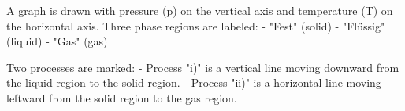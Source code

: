 A graph is drawn with pressure (p) on the vertical axis and temperature (T) on the horizontal axis. Three phase regions are labeled:  
- "Fest" (solid)  
- "Flüssig" (liquid)  
- "Gas" (gas)  

Two processes are marked:  
- Process "i)" is a vertical line moving downward from the liquid region to the solid region.  
- Process "ii)" is a horizontal line moving leftward from the solid region to the gas region.